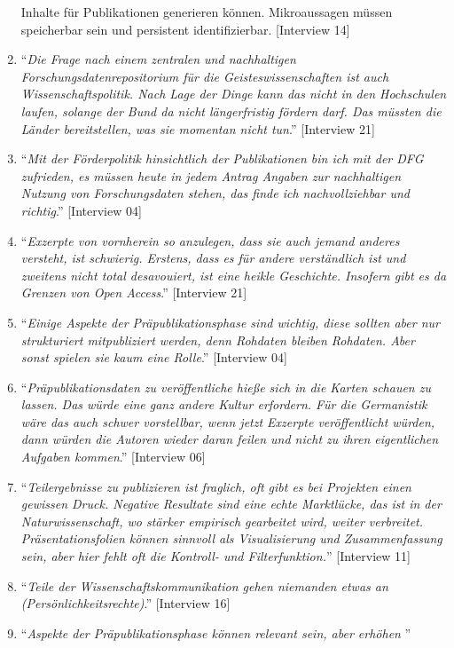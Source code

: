 \documentclass[a4paper,
fontsize=11pt,
oneside,
numbers=noperiodatend,
parskip=half-,
bibliography=totoc,
final
]{scrartcl}
\begin{document}
\begin{enumerate}
{{  Inhalte für Publikationen generieren können. Mikroaussagen müssen
  speicherbar sein und persistent identifizierbar}.} {[}Interview 14{]}
\item
  \enquote{\emph{Die Frage nach einem zentralen und nachhaltigen
  Forschungsdatenrepositorium für die Geisteswissenschaften ist auch
  Wissenschaftspolitik. Nach Lage der Dinge kann das nicht in den
  Hochschulen laufen, solange der Bund da nicht längerfristig fördern
  darf. Das müssten die Länder bereitstellen, was sie momentan nicht
  tun}.} {[}Interview 21{]}
\item
  \enquote{\emph{Mit der Förderpolitik hinsichtlich der Publikationen
  bin ich mit der DFG zufrieden, es müssen heute in jedem Antrag Angaben
  zur nachhaltigen Nutzung von Forschungsdaten stehen, das finde ich
  nachvollziehbar und richtig}.} {[}Interview 04{]}
\item
  \enquote{\emph{Exzerpte von vornherein so anzulegen, dass sie auch
  jemand anderes versteht, ist schwierig. Erstens, dass es für andere
  verständlich ist und zweitens nicht total desavouiert, ist eine heikle
  Geschichte. Insofern gibt es da Grenzen von Open Access}.}
  {[}Interview 21{]}
\item
  \enquote{\emph{Einige Aspekte der Präpublikationsphase sind wichtig,
  diese sollten aber nur strukturiert mitpubliziert werden, denn
  Rohdaten bleiben Rohdaten. Aber sonst spielen sie kaum eine Rolle}.}
  {[}Interview 04{]}
\item
  \enquote{\emph{Präpublikationsdaten zu veröffentliche hieße sich in
  die Karten schauen zu lassen. Das würde eine ganz andere Kultur
  erfordern. Für die Germanistik wäre das auch schwer vorstellbar, wenn
  jetzt Exzerpte veröffentlicht würden, dann würden die Autoren wieder
  daran feilen und nicht zu ihren eigentlichen Aufgaben kommen}.}
  {[}Interview 06{]}
\item
  \enquote{\emph{Teilergebnisse zu publizieren ist fraglich, oft gibt es
  bei Projekten einen gewissen Druck. Negative Resultate sind eine echte
  Marktlücke, das ist in der Naturwissenschaft, wo stärker empirisch
  gearbeitet wird, weiter verbreitet. Präsentationsfolien können
  sinnvoll als Visualisierung und Zusammenfassung sein, aber hier fehlt
  oft die Kontroll- und Filterfunktion.}} {[}Interview 11{]}
\item
  \enquote{\emph{Teile der Wissenschaftskommunikation gehen niemanden
  etwas an (Persönlichkeitsrechte)}.} {[}Interview 16{]}
\item
  \enquote{\emph{Aspekte der Präpublikationsphase können relevant sein, aber erhöhen
}}
\end{enumerate}
\end{document}
